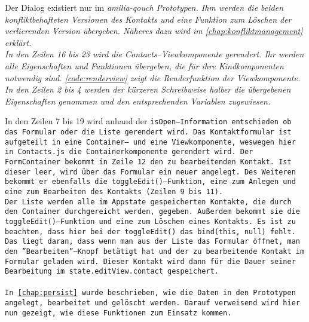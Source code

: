 Der Dialog existiert nur im \it{amilia-qouch} Prototypen.
Ihm werden die beiden konfliktbehafteten Versionen des Kontakts und eine Funktion zum Löschen der verlierenden Version übergeben. 
Näheres dazu wird im \autoref{chap:konfliktmanagement} erklärt.\\
%
In den Zeilen 16 bis 23 wird die Contacts--Viewkomponente gerendert.
Ihr werden alle Eigenschaften und Funktionen übergeben, die für ihre Kindkomponenten notwendig sind.
\autoref{code:renderview} zeigt die Renderfunktion der Viewkomponente.\\
In den Zeilen 2 bis 4 werden der kürzeren Schreibweise halber die übergebenen Eigenschaften genommen und den entsprechenden Variablen zugewiesen.
% 
%
\begin{center}
  
\end{center}
%
% 
In den Zeilen 7 bis 19 wird anhand der \tt{isOpen}--Information entschieden ob das Formular oder die Liste gerendert wird.
%
Das Kontaktformular ist aufgeteilt in eine Container-- und eine Viewkomponente, weswegen hier in \tt{Contacts.js} die Containerkomponente gerendert wird.
Der \tt{FormContainer} bekommt in Zeile 12 den zu bearbeitenden Kontakt.
Ist dieser leer, wird über das Formular ein neuer angelegt.
Des Weiteren bekommt er ebenfalls die \tt{toggleEdit()}--Funktion, eine zum Anlegen und eine zum Bearbeiten des Kontakts (Zeilen 9 bis 11).\\
%
Der Liste werden alle im \gls{App}state gespeicherten Kontakte, die durch den Container durchgereicht werden, gegeben.
Außerdem bekommt sie die \tt{toggleEdit()}--Funktion und eine zum Löschen eines Kontakts.
Es ist zu beachten, dass hier bei der \tt{toggleEdit()} das \tt{bind(this, null)} fehlt. Das liegt daran, dass wenn man aus der Liste das Formular öffnet, man den ''Bearbeiten''--Knopf betätigt hat und der zu bearbeitende Kontakt im Formular geladen wird.
Dieser Kontakt wird dann für die Dauer seiner Bearbeitung im \tt{state.editView.contact} gespeichert.\\\\
%
%
In \autoref{chap:persist} wurde beschrieben, wie die Daten in den Prototypen angelegt, bearbeitet und gelöscht werden. Darauf verweisend wird hier nun gezeigt, wie diese Funktionen zum Einsatz kommen.